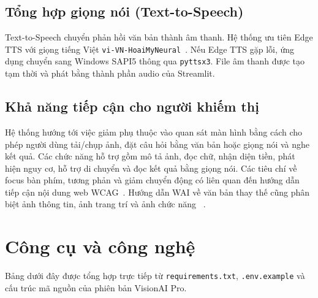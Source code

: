 \subsection{Tổng hợp giọng nói (Text-to-Speech)}

Text-to-Speech  chuyển phản hồi văn bản thành âm thanh. Hệ thống
ưu tiên Edge TTS với giọng tiếng Việt \texttt{vi-VN-HoaiMyNeural}~\cite{EdgeTTS2026}. Nếu Edge TTS gặp
lỗi, ứng dụng chuyển sang Windows SAPI5 thông qua \texttt{pyttsx3}. File âm thanh
được tạo tạm thời và phát bằng thành phần audio của Streamlit.

\subsection{Khả năng tiếp cận cho người khiếm thị}

Hệ thống hướng tới việc giảm phụ thuộc vào quan sát màn hình bằng cách cho
phép người dùng tải/chụp ảnh, đặt câu hỏi bằng văn bản hoặc giọng nói và
nghe kết quả. Các chức năng hỗ trợ gồm mô tả ảnh, đọc chữ, nhận diện tiền,
phát hiện nguy cơ, hỗ trợ di chuyển và đọc kết quả bằng giọng nói. Các tiêu
chí về focus bàn phím, tương phản và giảm chuyển động có liên quan đến hướng
dẫn tiếp cận nội dung web WCAG~\cite{W3CWCAG22}. Hướng dẫn WAI về văn bản thay
thế cũng phân biệt ảnh thông tin, ảnh trang trí và ảnh chức năng
~\cite{W3CImagesTutorial2026}.

\section{Công cụ và công nghệ}

Bảng dưới đây được tổng hợp trực tiếp từ \texttt{requirements.txt}, \texttt{.env.example}
và cấu trúc mã nguồn của phiên bản VisionAI Pro.

